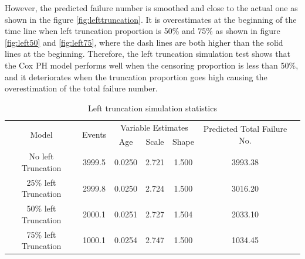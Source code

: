 \documentclass[12pt,letterpaper]{article}
\begin{document}
However, the predicted failure number is smoothed and close to the actual one as shown in the figure \ref{fig:lefttruncation}. It is overestimates at the beginning of the time line when left truncation proportion is 50\% and 75\% as shown in figure \ref{fig:left50} and \ref{fig:left75}, where the dash lines are both higher than the solid lines at the beginning.
Therefore, the left truncation simulation test shows that the Cox PH model performs well when the censoring proportion is less than 50\%, and it deteriorates when the truncation proportion goes high causing the overestimation of the total failure number.
\begin{table}[h!]
	\renewcommand{\arraystretch}{1.5}
	\small
	\centering
	\caption{Left truncation simulation statistics}
	\begin{tabular}{ccccccc}
		\hline
		\multirow{2}[4]{*}{Model} & \multirow{2}[4]{*}{Events} & \multicolumn{3}{c}{Variable Estimates} & \multirow{2}{3cm}{Predicted Total Failure No.}  \\
		\cline{3-5} %
		&       & Age   & Scale & Shape &  &\\				
		\hline
		No left Truncation & 3999.5  & 0.0250 & 2.721 & 1.500  & 3993.38 \\
		25\%  left Truncation & 2999.8  & 0.0250 & 2.724  & 1.500  & 3016.20 \\
		50\%  left Truncation & 2000.1  & 0.0251 & 2.727 & 1.504  & 2033.10 \\
		75\%  left Truncation & 1000.1  & 0.0254 & 2.747 & 1.500  & 1034.45 \\
		\hline
	\end{tabular}%
	\label{tab:lefttruncation}%
\end{table}%
\end{document}
